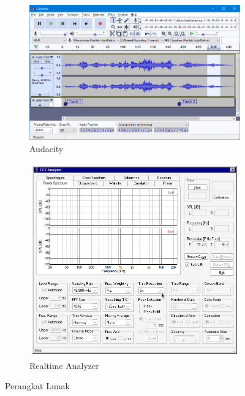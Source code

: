 \documentclass{article}
\begin{document}
\begin{itemize}
		\begin{figure}[H]
			\centering
			\begin{subfigure}[]{.40\textwidth}
				\includegraphics[width=\textwidth]{images/audacity}
				\caption{Audacity}
			\end{subfigure}
			\begin{subfigure}[]{.40\textwidth}
				\includegraphics[width=\textwidth]{images/rta}
				\caption{Realtime Analyzer}
			\end{subfigure}
			\caption{Perangkat Lunak}
		\end{figure}

	\end{itemize}
\end{document}
